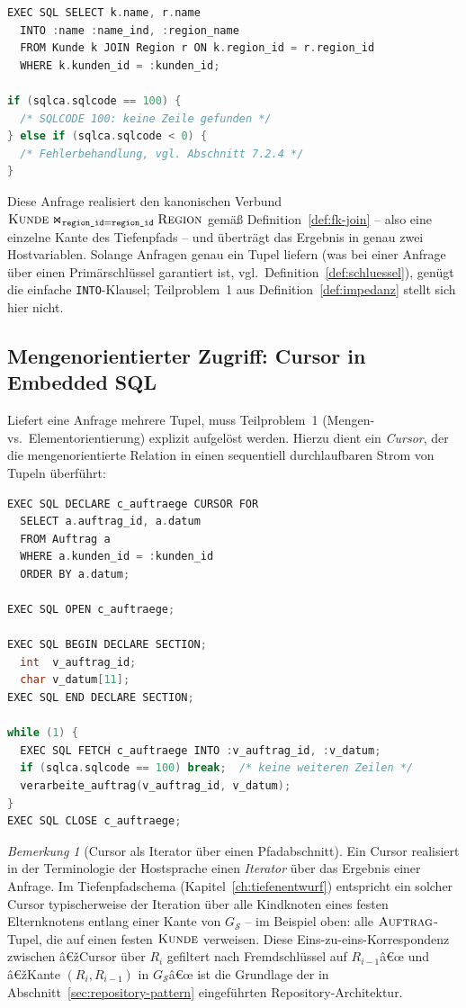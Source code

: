 ﻿\documentclass[a4paper,12pt]{report}
\theoremstyle{definition}
\theoremstyle{remark}
\newtheorem{remark}{Bemerkung}[chapter]
\begin{document}
\begin{lstlisting}[language=C]
EXEC SQL SELECT k.name, r.name
  INTO :name :name_ind, :region_name
  FROM Kunde k JOIN Region r ON k.region_id = r.region_id
  WHERE k.kunden_id = :kunden_id;

if (sqlca.sqlcode == 100) {
  /* SQLCODE 100: keine Zeile gefunden */
} else if (sqlca.sqlcode < 0) {
  /* Fehlerbehandlung, vgl. Abschnitt 7.2.4 */
}
\end{lstlisting}

Diese Anfrage realisiert den kanonischen Verbund
$\textsc{Kunde}\Join_{\texttt{region\_id}=\texttt{region\_id}}\textsc{Region}$
gemäß Definition~\ref{def:fk-join} -- also eine einzelne Kante des
Tiefenpfads -- und überträgt das Ergebnis in genau zwei Hostvariablen.
Solange Anfragen genau ein Tupel liefern (was bei einer Anfrage über
einen Primärschlüssel garantiert ist, vgl.\
Definition~\ref{def:schluessel}), genügt die einfache
\texttt{INTO}-Klausel; Teilproblem~1 aus
Definition~\ref{def:impedanz} stellt sich hier nicht.

\subsection{Mengenorientierter Zugriff: Cursor in Embedded SQL}
\label{sec:embedded-cursor}

Liefert eine Anfrage mehrere Tupel, muss Teilproblem~1
(Mengen- vs.\ Elementorientierung) explizit aufgelöst werden. Hierzu
dient ein \emph{Cursor}, der die mengenorientierte Relation in einen
sequentiell durchlaufbaren Strom von Tupeln überführt:

\begin{lstlisting}[language=C]
EXEC SQL DECLARE c_auftraege CURSOR FOR
  SELECT a.auftrag_id, a.datum
  FROM Auftrag a
  WHERE a.kunden_id = :kunden_id
  ORDER BY a.datum;

EXEC SQL OPEN c_auftraege;

EXEC SQL BEGIN DECLARE SECTION;
  int  v_auftrag_id;
  char v_datum[11];
EXEC SQL END DECLARE SECTION;

while (1) {
  EXEC SQL FETCH c_auftraege INTO :v_auftrag_id, :v_datum;
  if (sqlca.sqlcode == 100) break;  /* keine weiteren Zeilen */
  verarbeite_auftrag(v_auftrag_id, v_datum);
}
EXEC SQL CLOSE c_auftraege;
\end{lstlisting}

\begin{remark}[Cursor als Iterator über einen Pfadabschnitt]
\label{rem:cursor-iterator}
Ein Cursor realisiert in der Terminologie der Hostsprache einen
\emph{Iterator} über das Ergebnis einer Anfrage. Im Tiefenpfadschema
(Kapitel~\ref{ch:tiefenentwurf}) entspricht ein solcher Cursor
typischerweise der Iteration über alle Kindknoten eines festen
Elternknotens entlang einer Kante von $G_{\mathcal{S}}$ -- im Beispiel
oben: alle $\textsc{Auftrag}$-Tupel, die auf einen festen
$\textsc{Kunde}$ verweisen. Diese Eins-zu-eins-Korrespondenz zwischen
â€žCursor über $R_i$ gefiltert nach Fremdschlüssel auf $R_{i-1}$â€œ und
â€žKante $(R_i,R_{i-1})$ in $G_{\mathcal{S}}$â€œ ist die Grundlage der in
Abschnitt~\ref{sec:repository-pattern} eingeführten
Repository-Architektur.
\end{remark}
\end{document}
